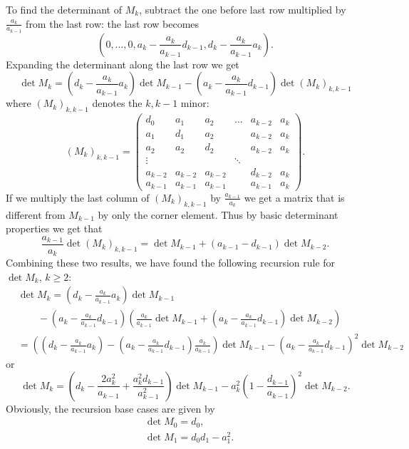 \documentclass[12pt]{article}
\numberwithin{equation}{section}
\theoremstyle{definition}
\theoremstyle{remark}
\begin{document}
To find the determinant of $M_k$,
subtract the one before last row multiplied by $\frac{a_{k}}{a_{k-1}}$ from the last row: the last row becomes
\[
    (0,\dots,0,a_k-\frac{a_k}{a_{k-1}}d_{k-1},d_k-\frac{a_k}{a_{k-1}}a_{k}).
\]
Expanding the determinant along the last row we get
\[
    \det M_k = (d_k-\frac{a_k}{a_{k-1}}a_{k}) \det M_{k-1}-(a_k-\frac{a_k}{a_{k-1}}d_{k-1}) \det (M_k)_{k,k-1}
\]
where $(M_k)_{k,k-1}$ denotes the $k,k-1$ minor:
\[
    (M_k)_{k,k-1}=
    \begin{pmatrix}
        d_0 &   a_1 &   a_2 &       \dots   &   a_{k-2} &   a_k \\
        a_1 &   d_1 &   a_2 &               &   a_{k-2} &   a_k \\
        a_2 &   a_2 &   d_2 &                   &   a_{k-2} &   a_k \\
        \vdots  &   &   &   \ddots  \\
        a_{k-2} &   a_{k-2} & a_{k-2}   &                   &   d_{k-2} &   a_k \\
        a_{k-1} &   a_{k-1} & a_{k-1}   &                   &   a_{k-1} &   a_k
    \end{pmatrix}
    .
\]
If we multiply the last column of $(M_k)_{k,k-1}$ by $\frac{a_{k-1}}{a_k}$
we get a matrix that is different from $M_{k-1}$ by only the corner element.
Thus by basic determinant properties we get that
\[
    \frac{a_{k-1}}{a_k}\det (M_k)_{k,k-1} = \det M_{k-1}+(a_{k-1}-d_{k-1}) \det M_{k-2}.
\]
Combining these two results, we have found the following recursion rule for $\det M_k$, $k\geq 2$:
\begin{align*}
    &\det M_k = (d_k-\frac{a_k}{a_{k-1}}a_{k}) \det M_{k-1} \\&\qquad -(a_k-\frac{a_k}{a_{k-1}}d_{k-1})\left(\frac{a_k}{a_{k-1}} \det M_{k-1}+(a_{k}-\frac{a_k}{a_{k-1}}d_{k-1}) \det M_{k-2}\right) \\
            &= \left((d_k-\frac{a_k}{a_{k-1}}a_{k})-(a_k-\frac{a_k}{a_{k-1}}d_{k-1}) \frac{a_k}{a_{k-1}}\right) \det M_{k-1} -\left(a_k-\frac{a_k}{a_{k-1}}d_{k-1}\right)^2\det M_{k-2}
\end{align*}
or
\begin{equation}\label{E:mrecursion}
    \det M_k= \left(d_k-\frac{2 a_k^2}{a_{k-1}}+\frac{a_k^2 d_{k-1}}{a_{k-1}^2} \right) \det M_{k-1}-a_k^2\left(1-\frac{d_{k-1}}{a_{k-1}}\right)^2 \det M_{k-2} .
\end{equation}
Obviously, the recursion base cases are given by
\begin{align*}
    & \det M_0 = d_0, \\
    & \det M_1 = d_0 d_1-a_1^2.
\end{align*}
\end{document}
